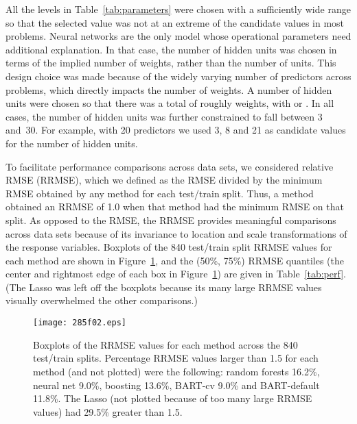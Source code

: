 \documentclass[aoas,nameyear,dvips]{arximspdf}
\begin{document}
All the levels in Table~\ref{tab:parameters} were chosen with a
sufficiently wide range so that the selected value was not at an extreme of
the candidate values in most problems.  Neural networks are the only model
whose operational parameters need additional explanation.  In that case,
the number of hidden units was chosen in terms of the implied number
of weights, rather than the number of units.  This design choice was
made because of the widely varying number of predictors across problems,
which directly impacts the number of weights.  A number of hidden units
were chosen so that there was a total of roughly  weights, with  or .
In all cases, the number of hidden units was further constrained to fall
between 3 and~30.
For example, with 20 predictors we used 3, 8 and 21 as candidate
values for the number of hidden units.




To facilitate performance comparisons across data sets, we considered
relative RMSE (RRMSE), which we defined as the RMSE divided by the
minimum RMSE obtained by any method for each test/train split.  Thus, a
method obtained an RRMSE of 1.0 when that method had the minimum RMSE
on that split.  As opposed to the RMSE, the RRMSE provides meaningful
comparisons across data sets because of its invariance to location and
scale transformations of the response variables.  Boxplots of the 840
test/train split RRMSE values for each method are shown in
Figure~\ref{fig:boxplot}, and the (50\%, 75\%) RRMSE quantiles (the
center and rightmost edge of each box in Figure~\ref{fig:boxplot}) are
given in Table~\ref{tab:perf}.  (The Lasso was left off the boxplots
because its many large RRMSE values visually overwhelmed the other
comparisons.)

\begin{figure}[b]

\texttt{[image: 285f02.eps]}

\caption{Boxplots of the RRMSE values for each method across the 840 test/train splits.
Percentage RRMSE  values larger than 1.5 for each method (and not plotted)
were the following: random forests 16.2\%, neural net 9.0\%, boosting 13.6\%, BART-cv
9.0\% and BART-default 11.8\%.  The Lasso (not plotted because of too many
large RRMSE values) had 29.5\% greater than 1.5.}\label{fig:boxplot}
\end{figure}
\end{document}

